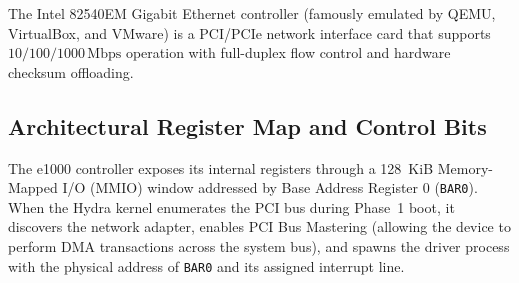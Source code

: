 The Intel 82540EM Gigabit Ethernet controller (famously emulated by QEMU, VirtualBox, and VMware) is a PCI/PCIe network interface card that supports $10/100/1000\,\text{Mbps}$ operation with full-duplex flow control and hardware checksum offloading.

\subsection{Architectural Register Map and Control Bits}

The e1000 controller exposes its internal registers through a 128~KiB Memory-Mapped I/O (MMIO) window addressed by Base Address Register 0 (\texttt{BAR0}). When the Hydra kernel enumerates the PCI bus during Phase~1 boot, it discovers the network adapter, enables PCI Bus Mastering (allowing the device to perform DMA transactions across the system bus), and spawns the driver process with the physical address of \texttt{BAR0} and its assigned interrupt line.

